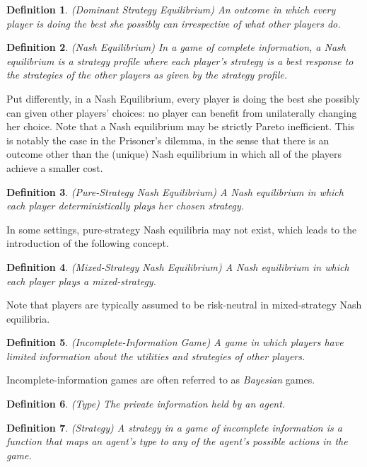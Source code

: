 \documentclass{article}
\newtheorem{definition}{Definition}
\begin{document}
\begin{definition}
(Dominant Strategy Equilibrium) An outcome in which every player is doing the best she possibly can irrespective of what other players do.
\end{definition}

\begin{definition}
(Nash Equilibrium) In a game of complete information, a Nash equilibrium is a strategy profile
where each player's strategy is a best response to the strategies of the other players as given
by the strategy profile.
\end{definition}

Put differently, in a Nash Equilibrium, every player is doing the best she possibly can given other players' choices: no player can benefit from unilaterally changing her choice. Note that a Nash equilibrium may be strictly Pareto inefficient. This is notably the case in the Prisoner's dilemma, in the sense that there is an outcome other than the (unique) Nash equilibrium in which all of the players achieve a smaller cost.

\begin{definition}
(Pure-Strategy Nash Equilibrium) A Nash equilibrium in which each player deterministically plays her chosen strategy.
\end{definition}

In some settings, pure-strategy Nash equilibria may not exist, which leads to the introduction of the following concept.

\begin{definition}
(Mixed-Strategy Nash Equilibrium) A Nash equilibrium in which each player plays a mixed-strategy.
\end{definition}

Note that players are typically assumed to be risk-neutral in mixed-strategy Nash equilibria.

\begin{definition}
(Incomplete-Information Game) A game in which players have limited information about the utilities and strategies of other players.
\end{definition}

Incomplete-information games are often referred to as \textit{Bayesian} games.

\begin{definition}
(Type) The private information held by an agent.
\end{definition}

\begin{definition}
(Strategy) A strategy in a game of incomplete information is a function that maps an agent's type to
any of the agent's possible actions in the game.
\end{definition}
\end{document}

